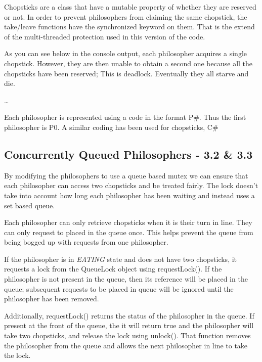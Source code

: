 \documentclass[12pt,letterpaper,titlepage]{article}
\begin{document}
  Chopsticks are a class that have a mutable property of whether they are reserved or not. In order to prevent philosophers from claiming the same chopstick, the take/leave functions have the synchronized keyword on them. That is the extend of the multi-threaded protection used in this version of the code.
  
  As you can see below in the console output, each philosopher acquires a single chopstick. However, they are then unable to obtain a second one because all the chopsticks have been reserved; This is deadlock. Eventually they all starve and die.
  
  
  \begin{center}
    \dots
  \end{center}
  
  
  Each philosopher is represented using a code in the format P\#. Thus the first philosopher is P0. A similar coding has been used for chopsticks, C\#
  
  \subsection{Concurrently Queued Philosophers - 3.2 \& 3.3}
  By modifying the philosophers to use a queue based mutex we can ensure that each philosopher can access two chopsticks and be treated fairly. The lock doesn't take into account how long each philosopher has been waiting and instead uses a set based queue.
  
  Each philosopher can only retrieve chopsticks when it is their turn in line. They can only request to placed in the queue once. This helps prevent the queue from being bogged up with requests from one philosopher.
  
  If the philosopher is in \textit{EATING} state and does not have two chopsticks, it requests a lock from the QueueLock object using requestLock(). If the philosopher is not present in the queue, then its reference will be placed in the queue; subsequent requests to be placed in queue will be ignored until the philosopher has been removed.
  
  Additionally, requestLock() returns the status of the philosopher in the queue. If present at the front of the queue, the it will return true and the philosopher will take two chopsticks, and release the lock using unlock(). That function removes the philosopher from the queue and allows the next philosopher in line to take the lock.
  
\end{document}

